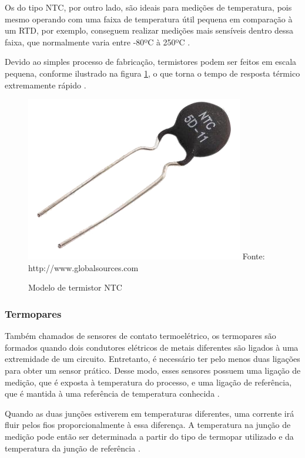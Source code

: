 Os do tipo NTC, por outro lado, são ideais para medições de temperatura, pois mesmo operando com uma faixa de
temperatura útil pequena em comparação à um RTD, por exemplo, conseguem realizar medições mais sensíveis
dentro dessa faixa, que normalmente varia entre -80ºC à 250ºC \cite{sinclair2001,thomazini_albuquerque2005}.

Devido ao simples processo de fabricação, termistores podem ser feitos em escala pequena, conforme ilustrado na
figura \ref{figura:ntc}, o que torna o tempo de resposta térmico extremamente rápido
\cite{peeters_peetermans_indesteege2007,sinclair2001}.

\begin{figure}[h]
	\caption{Modelo de termistor NTC}
	\centering
	\includegraphics[scale=0.3]{../images/thermistor.png}
	\hspace{\linewidth}
	Fonte: http://www.globalsources.com
	\label{figura:ntc}
\end{figure}

\subsubsection{Termopares}
Também chamados de sensores de contato termoelétrico, os termopares são formados quando dois condutores
elétricos de metais diferentes são ligados à uma extremidade de um circuito. Entretanto, é necessário ter
pelo menos duas ligações para obter um sensor prático. Desse modo, esses sensores possuem uma ligação de
medição, que é exposta à temperatura do processo, e uma ligação de referência, que é mantida à uma referência
de temperatura conhecida \cite{fraden2010,fontes2005}.

Quando as duas junções estiverem em temperaturas diferentes, uma corrente irá fluir pelos fios
proporcionalmente à essa diferença. A temperatura na junção de medição pode então ser determinada a partir do
tipo de termopar utilizado e da temperatura da junção de referência \cite{fraden2010}.

